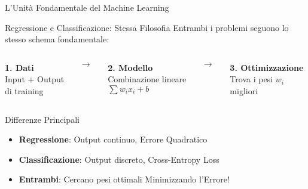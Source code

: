\documentclass[aspectratio=169]{beamer}
\begin{document}
%
%
\begin{frame}{L'Unità Fondamentale del Machine Learning}
\begin{block}{Regressione e Classificazione: Stessa Filosofia}
Entrambi i problemi seguono lo stesso schema fondamentale:
\end{block}

\vspace{0.5cm}

\begin{columns}
\begin{column}{0.3\textwidth}
\centering
\textbf{1. Dati}\\
\vspace{0.2cm}
Input + Output\\
di training
\end{column}
\begin{column}{0.05\textwidth}
\centering
$\rightarrow$
\end{column}
\begin{column}{0.3\textwidth}
\centering
\textbf{2. Modello}\\
\vspace{0.2cm}
Combinazione lineare\\
$\sum w_i x_i + b$
\end{column}
\begin{column}{0.05\textwidth}
\centering
$\rightarrow$
\end{column}
\begin{column}{0.3\textwidth}
\centering
\textbf{3. Ottimizzazione}\\
\vspace{0.2cm}
Trova i pesi $w_i$\\
migliori
\end{column}
\end{columns}

\vspace{1cm}

\begin{alertblock}{Differenze Principali}
\begin{itemize}
    \item \textbf{Regressione}: Output continuo, Errore Quadratico
    \item \textbf{Classificazione}: Output discreto, Cross-Entropy Loss
    \item \textbf{Entrambi}: Cercano pesi ottimali Minimizzando l'Errore!
\end{itemize}
\end{alertblock}
\end{frame}
%
\end{document}

